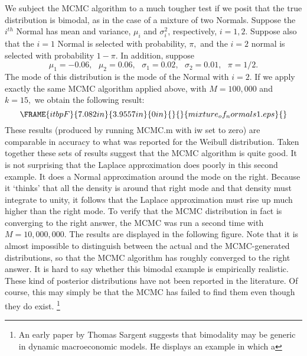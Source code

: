 \documentclass[12pt,thmsa]{article}
\begin{document}
\begin{enumerate}
We subject the MCMC algorithm to a much tougher test if we posit that the
true distribution is bimodal, as in the case of a mixture of two Normals.
Suppose the $i^{th}$ Normal has mean and variance, $\mu _{i}$ and $\sigma
_{i}^{2}$, respectively, $i=1,2.$ Suppose also that the $i=1$ Normal is
selected with probability, $\pi ,$ and the $i=2$ normal is selected with
probability $1-\pi .$ In addition, suppose%
\begin{equation*}
\mu _{1}=-0.06,\text{ }\mu _{2}=0.06,\text{ }\sigma _{1}=0.02,\text{ }\sigma
_{2}=0.01,\text{ }\pi =1/2.
\end{equation*}%
The mode of this distribution is the mode of the Normal with $i=2.$ If we
apply exactly the same MCMC algorithm applied above, with $M=100,000$ and $%
k=15,$ we obtain the following result:%
\begin{equation*}
\FRAME{itbpF}{7.082in}{3.9557in}{0in}{}{}{mixture_of_normals1.eps}{\special%
{language "Scientific Word";type "GRAPHIC";maintain-aspect-ratio
TRUE;display "USEDEF";valid_file "F";width 7.082in;height 3.9557in;depth
0in;original-width 19.8924in;original-height 11.0782in;cropleft "0";croptop
"1";cropright "1";cropbottom "0";filename
'mixture_of_normals1.eps';file-properties "XNPEU";}}
\end{equation*}%
These results (produced by running MCMC.m with iw set to zero) are
comparable in accuracy to what was reported for the Weibull distribution.
Taken together these sets of results suggest that the MCMC algorithm is
quite good. It is not surprising that the Laplace approximation does poorly
in this second example. It does a Normal approximation around the mode on
the right. Because it `thinks' that all the density is around that right
mode and that density must integrate to unity, it follows that the Laplace
approximation must rise up much higher than the right mode. To verify that
the MCMC distribution in fact is converging to the right answer, the MCMC
was run a second time with $M=10,000,000.$ The results are displayed in the
following figure. Note that it is almost impossible to distinguish between
the actual and the MCMC-generated distributions, so that the MCMC algorithm
has roughly converged to the right answer. It is hard to say whether this
bimodal example is empirically realistic. These kind of posterior
distributions have not been reported in the literature. Of course, this may
simply be that the MCMC has failed to find them even though they do exist.%
\footnote{%
An early paper by Thomas Sargent suggests that bimodality may be generic in
dynamic macroeconomic models. He displays an example in which a
}
\end{enumerate}
\end{document}
